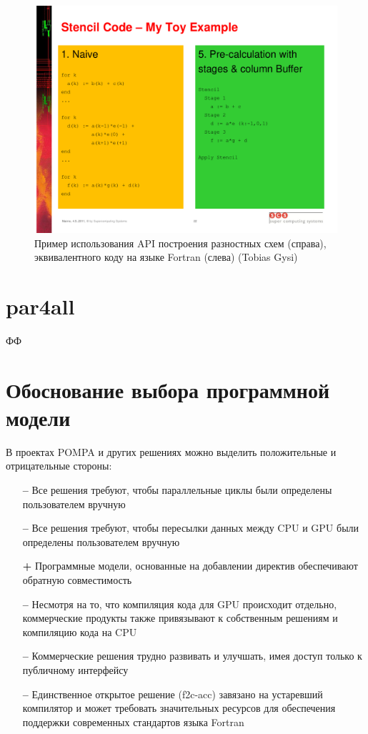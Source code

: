 \documentclass[a4,12pt]{report}
\begin{document}
\begin{figure}
\centering
\includegraphics[scale=0.4]{slides/05.pdf}
\caption{Пример использования API построения разностных схем (справа), эквивалентного коду на языке Fortran (слева) (Tobias Gysi)}
\label{fig:05}
\end{figure}


\section{par4all}

ФФ

\section{Обоснование выбора программной модели}

В проектах POMPA и других решениях можно выделить положительные и отрицательные стороны:

\begin{itemize}
\item[\textbf{--}] Все решения требуют, чтобы параллельные циклы были определены пользователем вручную
\item[\textbf{--}] Все решения требуют, чтобы пересылки данных между CPU и GPU были определены пользователем вручную
\item[\textbf{+}] Программные модели, основанные на добавлении директив обеспечивают обратную совместимость
\item[\textbf{--}] Несмотря на то, что компиляция кода для GPU происходит отдельно, коммерческие продукты также привязывают к собственным решениям и компиляцию кода на CPU
\item[\textbf{--}] Коммерческие решения трудно развивать и улучшать, имея доступ только к публичному интерфейсу
\item[\textbf{--}] Единственное открытое решение (f2c-acc) завязано на устаревший компилятор и может требовать значительных ресурсов для обеспечения поддержки современных стандартов языка Fortran
\end{itemize}
\end{document}
